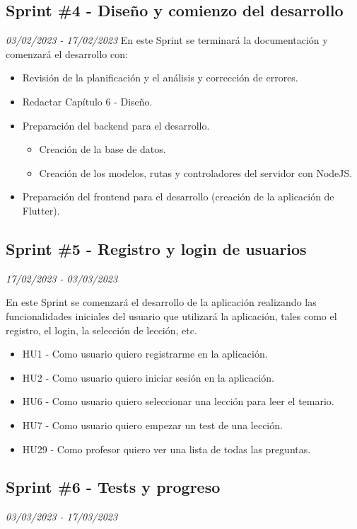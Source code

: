\subsection{Sprint \#4 - Diseño y comienzo del desarrollo}
\textit{03/02/2023   -   17/02/2023}
En este Sprint se terminará la documentación y comenzará el desarrollo con:
\begin{itemize}
    \item Revisión de la planificación y el análisis y corrección de errores.
    \item Redactar Capítulo 6 - Diseño.
    \item Preparación del backend para el desarrollo.
          \begin{itemize}
              \item Creación de la base de datos.
              \item Creación de los modelos, rutas y controladores del servidor con NodeJS.
          \end{itemize}
    \item Preparación del frontend para el desarrollo (creación de la aplicación de Flutter).
\end{itemize}

\subsection{Sprint \#5 - Registro y login de usuarios}
\textit{17/02/2023   -   03/03/2023}

En este Sprint se comenzará el desarrollo de la aplicación realizando las funcionalidades iniciales del usuario
que utilizará la aplicación, tales como el registro, el login, la selección de lección, etc.
\begin{itemize}
    \item HU1 - Como usuario quiero registrarme en la aplicación.
    \item HU2 - Como usuario quiero iniciar sesión en la aplicación.
    \item HU6 - Como usuario quiero seleccionar una lección para leer el temario.
    \item HU7 - Como usuario quiero empezar un test de una lección.
    \item HU29 - Como profesor quiero ver una lista de todas las preguntas.

\end{itemize}


\subsection{Sprint \#6 - Tests y progreso}
\textit{03/03/2023   -   17/03/2023}


